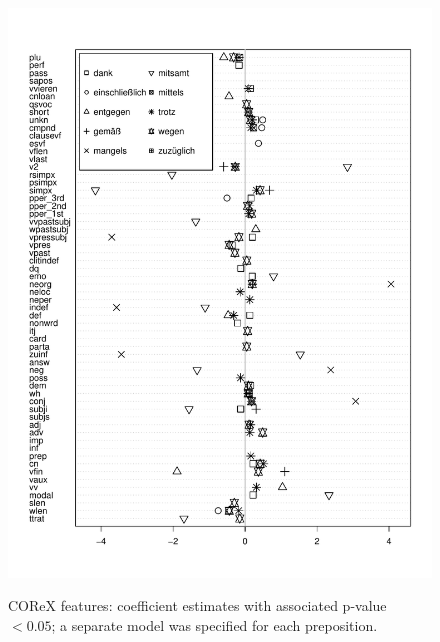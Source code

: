 \documentclass[11pt]{article}
\begin{document}
\begin{figure}
  \includegraphics[scale=.9]{../R/prep-individual-coeffs-bw}
  \label{coeffs-corex-individial}
  \caption{COReX features: coefficient estimates with associated p-value $< 0.05$; a separate model was specified for each preposition.}
\end{figure}
\end{document}
